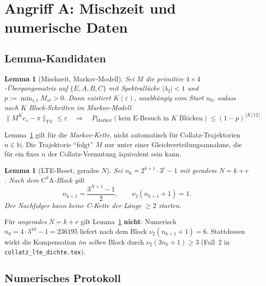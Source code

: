 \documentclass[12pt,a4paper]{article}
\newtheorem{lemma}[satz]{Lemma}
\newcommand{\vii}{\nu_2}
\newcommand{\N}{\mathbb{N}}
\begin{document}
\section{Angriff A: Mischzeit und numerische Daten}
\label{sec:angriffA}

\subsection{Lemma-Kandidaten}

\begin{lemma}[Mischzeit, Markov-Modell]
\label{lem:mischzeit}
Sei $M$ die primitive $4\times 4$-Übergangsmatrix auf
$\{E,A,B,C\}$ mit Spektrallücke $|\lambda_2|<1$ und
$p:=\min_{s,t}M_{st}>0$. Dann existiert $K(\varepsilon)$,
\emph{unabhängig} vom Start $n_0$, sodass nach $K$ Block-Schritten
im \emph{Markov-Modell}
\[
  \|M^K e_s-\pi\|_{\mathrm{TV}} \leq \varepsilon
  \quad\Rightarrow\quad
  P_{\mathrm{Markov}}(\text{kein E-Besuch in }K\text{ Blöcken})
  \leq (1-p)^{\lfloor K/12\rfloor}.
\]
\end{lemma}

\begin{tcolorbox}[heuristik,title={Zirkularitäts-Warnung}]
Lemma~\ref{lem:mischzeit} gilt für die \emph{Markov-Kette}, nicht
automatisch für Collatz-Trajektorien $n\in\N$. Die Trajektorie
``folgt'' $M$ nur unter einer Gleichverteilungsannahme, die für
ein fixes $n$ der Collatz-Vermutung äquivalent sein kann.
\end{tcolorbox}

\begin{lemma}[LTE-Reset, gerades $N$]
\label{lem:ltereset}
Sei $n_0=2^{k+1}\cdot 3^r-1$ mit geradem $N=k+r$. Nach dem
$\mathrm{C}^k\mathrm{A}$-Block gilt
\[
  n_{k+1}=\frac{3^{N+1}-1}{2},\qquad \vii(n_{k+1}+1)=1.
\]
Der Nachfolger kann keine C-Kette der Länge $\geq 2$ starten.
\end{lemma}

\begin{tcolorbox}[bewiesen,title={Korrektur zum ungeraden $N$}]
Für \emph{ungerades} $N=k+r$ gilt Lemma~\ref{lem:ltereset} \textbf{nicht}:
Numerisch $n_0=4\cdot 3^{10}-1=236195$ liefert nach dem Block
$\vii(n_{k+1}+1)=6$. Stattdessen wirkt die Kompensation \emph{im selben}
Block durch $\vii(3n_k+1)\geq 3$ (Fall~2 in
\texttt{collatz\_lte\_dichte.tex}).
\end{tcolorbox}

\subsection{Numerisches Protokoll}
\end{document}
